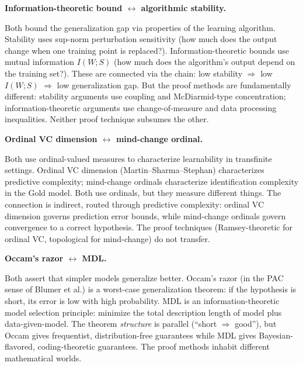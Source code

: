 \begin{obstbox}
\textbf{Information-theoretic bound $\leftrightarrow$ algorithmic
stability.}

\medskip\noindent
Both bound the generalization gap via properties of the learning
algorithm. Stability uses sup-norm perturbation sensitivity (how much
does the output change when one training point is replaced?).
Information-theoretic bounds use mutual information $I(W; S)$ (how much
does the algorithm's output depend on the training set?). These are
connected via the chain: low stability $\Rightarrow$ low $I(W; S)$
$\Rightarrow$ low generalization gap. But the proof methods are
fundamentally different: stability arguments use coupling and
McDiarmid-type concentration; information-theoretic arguments use
change-of-measure and data processing inequalities. Neither proof
technique subsumes the other.
\end{obstbox}

\begin{obstbox}
\textbf{Ordinal VC dimension $\leftrightarrow$ mind-change ordinal.}

\medskip\noindent
Both use ordinal-valued measures to characterize learnability in
transfinite settings. Ordinal VC dimension (Martin--Sharma--Stephan)
characterizes predictive complexity; mind-change ordinals characterize
identification complexity in the Gold model. Both use ordinals, but they
measure different things. The connection is indirect, routed through predictive
complexity: ordinal VC dimension governs prediction error
bounds, while mind-change ordinals govern convergence to a correct
hypothesis. The proof techniques (Ramsey-theoretic for ordinal VC,
topological for mind-change) do not transfer.
\end{obstbox}

\begin{obstbox}
\textbf{Occam's razor $\leftrightarrow$ MDL.}

\medskip\noindent
Both assert that simpler models generalize better. Occam's razor (in the
PAC sense of Blumer et al.) is a worst-case generalization theorem:
if the hypothesis is short, its error is low with high probability.
MDL is an information-theoretic model selection principle: minimize the
total description length of model plus data-given-model. The theorem
\emph{structure} is parallel (``short $\Rightarrow$ good''), but Occam
gives frequentist, distribution-free guarantees while MDL gives
Bayesian-flavored, coding-theoretic guarantees. The proof methods
inhabit different mathematical worlds.

\hfill\cite{BlumerEhrenfeuchtHausslerWarmuth1987}
\end{obstbox}


